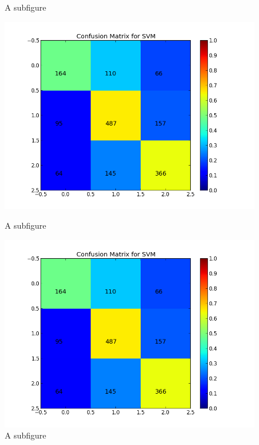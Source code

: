 \begin{figure}
\begin{minipage}{.5\textwidth}
  \caption{A subfigure}
  \label{fig:sub2}
\end{minipage}
\begin{minipage}{.5\textwidth}
  \centering
  \includegraphics[width=\linewidth]{../img/plots/grid/confusion_matrix_SVM.png}
  \caption{A subfigure}
  \label{fig:sub2}
\end{minipage}
\begin{minipage}{.5\textwidth}
  \centering
  \includegraphics[width=\linewidth]{../img/plots/grid/confusion_matrix_SVM.png}
  \caption{A subfigure}
  \label{fig:sub2}
\end{minipage}
\end{figure}

